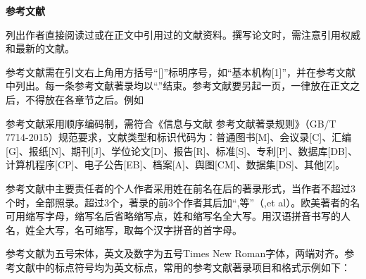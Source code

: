 \newpage
\begin{center}
    \sanhao\heiti
    \textbf{参考文献}    
\end{center}
列出作者直接阅读过或在正文中引用过的文献资料。撰写论文时，需注意引用权威和最新的文献。

参考文献需在引文右上角用方括号“[]”标明序号，如“基本机构[1]”，并在参考文献中列出。每一条参考文献著录均以“.”结束。参考文献要另起一页，一律放在正文之后，不得放在各章节之后。例如

参考文献采用顺序编码制，需符合《信息与文献 参考文献著录规则》（GB/T 7714-2015）规范要求，文献类型和标识代码为：普通图书[M]、会议录[C]、汇编[G]、报纸[N]、期刊[J]、学位论文[D]、报告[R]、标准[S]、专利[P]、数据库[DB]、计算机程序[CP]、电子公告[EB]、档案[A]、舆图[CM]、数据集[DS]、其他[Z]。

参考文献中主要责任者的个人作者采用姓在前名在后的著录形式，当作者不超过3个时，全部照录。超过3个，著录的前3个作者其后加“,等”（,et al）。欧美著者的名可用缩写字母，缩写名后省略缩写点，姓和缩写名全大写。用汉语拼音书写的人名，姓全大写，名可缩写，取每个汉字拼音的首字母。

参考文献为五号宋体，英文及数字为五号Times New Roman字体，两端对齐。参考文献中的标点符号均为英文标点，常用的参考文献著录项目和格式示例如下：

% 
% 


